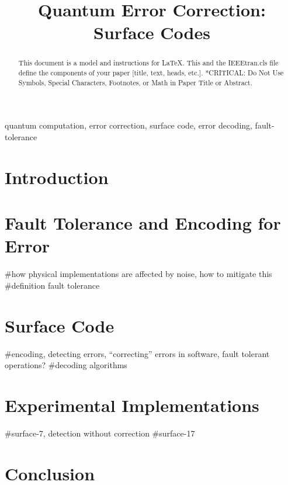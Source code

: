 \documentclass[conference]{IEEEtran}
\begin{document}
\title{Quantum Error Correction: Surface Codes}

\author{

  \and

}

\maketitle


\begin{abstract}
  This document is a model and instructions for \LaTeX. This and the
  IEEEtran.cls file define the components of your paper [title, text, heads,
  etc.]. *CRITICAL: Do Not Use Symbols, Special Characters, Footnotes, or Math
  in Paper Title or Abstract.
\end{abstract}

\begin{IEEEkeywords}
  quantum computation, error correction, surface code, error decoding, fault-tolerance
\end{IEEEkeywords}

\section{Introduction}


\section{Fault Tolerance and Encoding for Error}
#how physical implementations are affected by noise, how to mitigate this
#definition fault tolerance


\section{Surface Code}
#encoding, detecting errors, ``correcting'' errors in software, fault tolerant
operations?
#decoding algorithms


\section{Experimental Implementations}
#surface-7, detection without correction
#surface-17


\section{Conclusion}


\printbibliography
\end{document}
